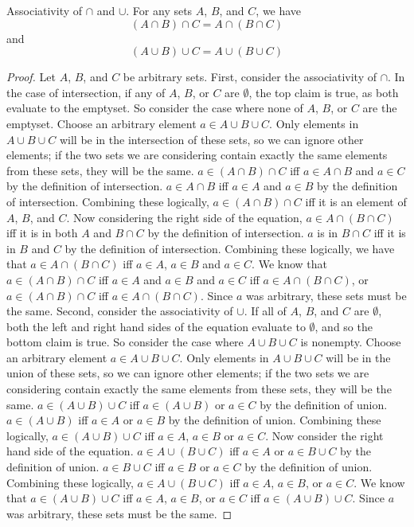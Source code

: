             \begin{majorEx}%
            Associativity of $\cap$ and $\cup$. For any sets $A$, $B$, and $C$, we have $$(A \cap B) \cap C = A \cap (B \cap C)$$  and $$(A \cup B) \cup C = A \cup (B \cup C)$$
            \begin{proof}
            Let $A$, $B$, and $C$ be arbitrary sets. First, consider the associativity of $\cap$. In the case of intersection, if any of $A$, $B$, or $C$ are $\emptyset$, the top claim is true, as both evaluate to the emptyset. So consider the case where none of $A$, $B$, or $C$ are the emptyset. Choose an arbitrary element $a \in A \cup B \cup C$. Only elements in $A \cup B \cup C$ will be in the intersection of these sets, so we can ignore other elements; if the two sets we are considering contain exactly the same elements from these sets, they will be the same. $a \in (A \cap B) \cap C$ iff $a \in A \cap B$ and $a \in C$ by the definition of intersection. $a\in A \cap B$ iff $a \in A$ and $a \in B$ by the definition of intersection. Combining these logically, $a \in (A \cap B) \cap C$ iff it is an element of $A$, $B$, and $C$. Now considering the right side of the equation, $a \in A \cap (B \cap C)$ iff it is in both $A$ and $B \cap C$ by the definition of intersection. $a$ is in $B \cap C$ iff it is in $B$ and $C$ by the definition of intersection. Combining these logically, we have that $a \in A \cap (B \cap C)$ iff $a \in A$, $a \in B$ and $a \in C$. We know that $a \in (A \cap B) \cap C$ iff $a \in A$ and $a \in B$ and $a \in C$ iff $a \in A \cap (B \cap C)$, or $a \in (A \cap B) \cap C$ iff $a \in A \cap (B \cap C)$. Since $a$ was arbitrary, these sets must be the same. \newline
            Second, consider the associativity of $\cup$. If all of $A$, $B$, and $C$ are $\emptyset$, both the left and right hand sides of the equation evaluate to $\emptyset$, and so the bottom claim is true. So consider the case where $A \cup B \cup C$ is nonempty. Choose an arbitrary element $a \in A \cup B \cup C$. Only elements in $A \cup B \cup C$ will be in the union of these sets, so we can ignore other elements; if the two sets we are considering contain exactly the same elements from these sets, they will be the same. $a \in (A \cup B) \cup C$ iff $a \in (A \cup B)$ or $a \in C$ by the definition of union. $a \in (A \cup B)$ iff $a \in A$ or $a \in B$ by the definition of union. Combining these logically, $a \in (A \cup B) \cup C$ iff $a \in A$, $a \in B$ or $a \in C$. Now consider the right hand side of the equation. $a \in A \cup (B \cup C)$ iff $a \in A$ or $a \in B \cup C$ by the definition of union.  $a \in B \cup C$ iff $a \in B$ or $a \in C$ by the definition of union. Combining these logically, $a \in A \cup (B \cup C)$ iff $a \in A$, $a \in B$, or $a \in C$. We know that $a \in (A \cup B) \cup C$ iff $a \in A$, $a \in B$, or $a \in C$ iff $a \in (A \cup B) \cup C$. Since $a$ was arbitrary, these sets must be the same.
            \end{proof}
            \end{majorEx}
